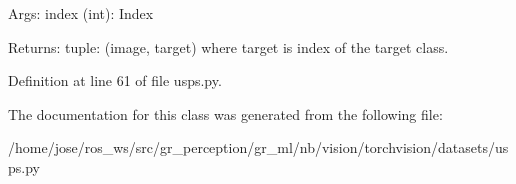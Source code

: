 \begin{DoxyVerb}Args:
    index (int): Index

Returns:
    tuple: (image, target) where target is index of the target class.
\end{DoxyVerb}
 

Definition at line 61 of file usps.\+py.



The documentation for this class was generated from the following file\+:\begin{DoxyCompactItemize}
\item 
/home/jose/ros\+\_\+ws/src/gr\+\_\+perception/gr\+\_\+ml/nb/vision/torchvision/datasets/usps.\+py\end{DoxyCompactItemize}
